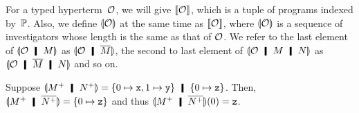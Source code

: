 For a typed
hyperterm~$\mathcal{O}$,
we will give $\llbracket{\mathcal{O}}\rrbracket$, which is a tuple of programs indexed
by~$\mathbb{P}$.
Also, we define $\llparenthesis{\mathcal{O}}\rrparenthesis$ at the same time as
$\llbracket{\mathcal{O}}\rrbracket$, where
$\llparenthesis{\mathcal{O}}\rrparenthesis$ is a sequence of investigators whose
length is the same as that of $\mathcal{O}$.
We refer to the last element of $\semoi{\hypert\hmid M}$ as
$\semoi{\hypert\hmid \overline{M}}$, the second to last element of
$\semoi{\hypert\hmid M\hmid N}$ as
$\semoi{\hypert\hmid \overline M\hmid N}$ and so on.
 \begin{example}
Suppose $\semoi{\m{M}\hmid \m{N}} = \{0\mapsto \p x, 1\mapsto \p
  y\}\hmid \{0\mapsto \p z\}$.
  Then,
  $\semoi{\m{M}\hmid \overline{\m{N}}} = \{0\mapsto\p z\}$ and thus
  $\semoi{\m{M}\hmid \overline{\m{N}}}(0) = \p z$.
 \end{example}

